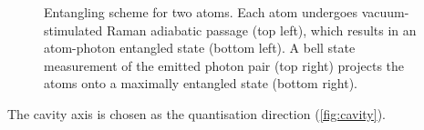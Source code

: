 \documentclass[../Thesis-IJspeert.tex]{subfiles}
\begin{document}
\begin{figure}[h]
	\caption[An example of a floating figure]{Entangling scheme for two  atoms. Each atom undergoes vacuum-stimulated Raman adiabatic passage (top left), which results in an atom-photon entangled state (bottom left). A bell state measurement of the emitted photon pair (top right) projects the atoms onto a maximally entangled state (bottom right).} %
	\label{fig:entangle} 
\end{figure}
The cavity axis is chosen as the quantisation direction (\autoref{fig:cavity}).
\end{document}
